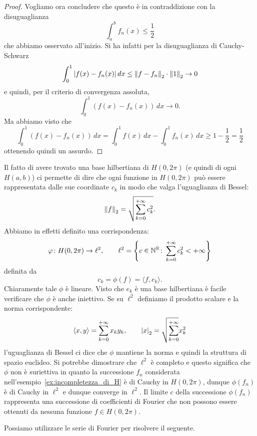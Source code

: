 \begin{proof}
Vogliamo ora concludere che questo è in contraddizione con la disuguaglianza
\[
  \int_a^b f_n(x) \le \frac 1 2
\]
che abbiamo osservato all'inizio.
Si ha infatti per la disuguaglianza di Cauchy-Schwarz
\begin{align*}
  \int_0^1 {\left|f(x)-f_n(x)\right|}\, dx
  \le {\left\Vert f-f_n\right\Vert}_2\cdot {\left\Vert 1\right\Vert}_2  \to 0
\end{align*}
e quindi, per il criterio di convergenza assoluta,
\[
  \int_0^1 (f(x) - f_n(x))\, dx \to 0.
\]
Ma abbiamo visto che
\[
  \int_0^1 (f(x) - f_n(x))\, dx
  = \int_0^1 f(x)\, dx - \int_0^1 f_n(x)\, dx
  \ge 1 - \frac 1 2 = \frac 1 2
\]
ottenendo quindi un assurdo.
\end{proof}

Il fatto di avere trovato una base hilbertiana di $H(0,2\pi)$ (e quindi
di ogni $H(a,b)$) ci permette di
dire che ogni funzione in $H(0,2\pi)$ può essere rappresentata dalle sue
coordinate $c_k$ in modo che valga l'uguaglianza di Bessel:
\[
  {\left\Vert f\right\Vert}_2 = \sqrt{\sum_{k=0}^{+\infty} c_k^2}.
\]
Abbiamo in effetti definito una corrispondenza:
\[
  \varphi \colon H(0,2\pi) \to \ell^2,
  \qquad
  \ell^2={\left\{ c\in {\mathbb N}^{\mathbb R} \colon \sum_{k=0}^{+\infty} c_k^2<+\infty \right\}}
\]
definita da
\[
  c_k = \phi(f) = \langle f, e_k\rangle.
\]
Chiaramente tale $\phi$ è lineare. Visto che $e_k$ è una base hilbertiana
è facile verificare che $\phi$ è anche iniettivo. Se su $\ell^2$
definiamo il prodotto scalare e la norma corrispondente:
\[
  \langle x,y\rangle = \sum_{k=0}^{+\infty} x_k y_k, \qquad
  {\left|x\right|}_2 = \sqrt{\sum_{k=0}^{+\infty}} x_k^2
\]
l'uguaglianza di Bessel ci dice che $\phi$ mantiene la norma e quindi
la struttura di spazio euclideo. Si potrebbe dimostrare che $\ell^2$
è completo e questo significa che $\phi$ non è suriettiva in quanto
la successione $f_n$
considerata nell'esempio~\ref{ex:incompletezza_di_H}
è di Cauchy in $H(0,2\pi)$, dunque $\phi(f_n)$ è di Cauchy in $\ell^2$
e dunque converge in $\ell^2$. Il limite $c$ della successione $\phi(f_n)$
rappresenta una successione di coefficienti di Fourier che non possono
essere ottenuti da nessuna funzione $f\in H(0,2\pi)$.

Possiamo utilizzare le serie di Fourier per risolvere 
il seguente.

